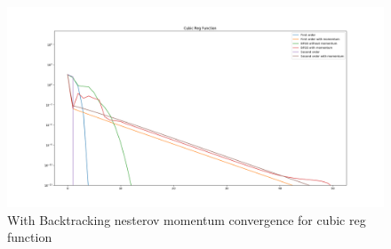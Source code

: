 \documentclass{article}
\begin{document}
\begin{center}
\begin{figure}[H]
	\includegraphics[width=\linewidth]{../Images/cubicregbacktrack1.png}
	\caption{With Backtracking nesterov momentum convergence for cubic reg function}
	\label{fig:With Backtracking nesterov momentum convergence for cubic reg function}
\end{figure}
\end{center}
\end{document}
